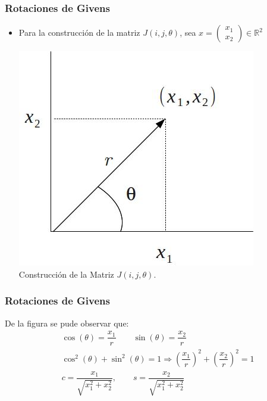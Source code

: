 \documentclass{beamer}
\begin{document}
\begin{frame}
  \frametitle{Rotaciones de Givens}
  \begin{itemize}
    \item<1-> Para la construcci\'on de la matriz $J(i,j,\theta)$, sea 
    $x=\left(\begin{array}{c}
      x_1\\
      x_2
     \end{array}\right) \in \mathbb{R}^2$

\begin{center}
\includegraphics[scale=0.35]{./rota2.jpg}\\
Construcci\'on de la Matriz $J(i,j,\theta)$.
\end{center}
  \end{itemize}
\end{frame}
\begin{frame}
  \frametitle{Rotaciones de Givens}
  De la figura se pude observar que:
\begin{eqnarray}
\nonumber & \cos(\theta) = \dfrac{x_1}{r} \quad\quad \sin(\theta) = \dfrac{x_2}{r}\\
\nonumber & \cos^2(\theta) + \sin^2(\theta) = 1 \Rightarrow \left(\dfrac{x_1}{r}\right)^2 + \left(\dfrac{x_2}{r}\right)^2 = 1\\
\nonumber & c = \dfrac{x_1}{\sqrt{x_1^2+x_2^2}}, \quad\quad s=\dfrac{x_2}{\sqrt{x_1^2+x_2^2}} 
\end{eqnarray}
\end{frame} 
\end{document}
